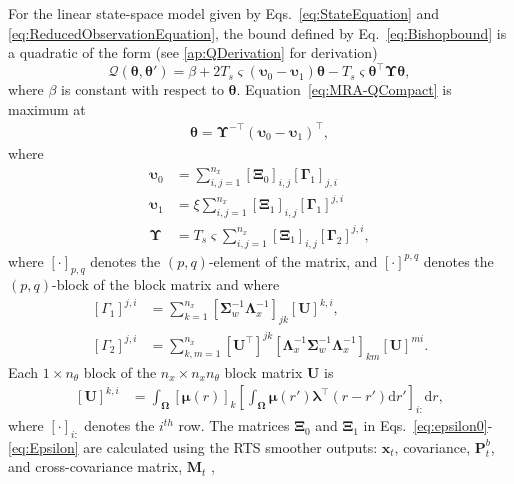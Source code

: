 \documentclass[review,authoryear,3p]{elsarticle}
\begin{document}
For the linear state-space model given by Eqs.~\eqref{eq:StateEquation} and \eqref{eq:ReducedObservationEquation}, the bound defined by Eq.~\eqref{eq:Bishopbound} is a quadratic of the form (see \ref{ap:QDerivation} for derivation) 
\begin{equation}\label{eq:MRA-QCompact}
\mathcal Q\left(\boldsymbol \theta,\boldsymbol\theta'\right)=\beta+2T_s\varsigma\left(\boldsymbol\upsilon_0-\boldsymbol\upsilon_1\right)\boldsymbol\theta-T_s\varsigma\boldsymbol\theta^\top\boldsymbol\Upsilon\boldsymbol\theta,
\end{equation}
where $\beta$ is constant with respect to $\boldsymbol\theta$. Equation~\eqref{eq:MRA-QCompact} is maximum at
\begin{align}\label{eq:MRA-thetahat}
\boldsymbol \theta= \boldsymbol\Upsilon^{-\top}(\boldsymbol\upsilon_0-\boldsymbol\upsilon_1)^\top,
\end{align}
where
\begin{align}
\boldsymbol\upsilon_0&=\sum_{i,j=1}^{n_x}[\boldsymbol\Xi_0]_{i,j}[\boldsymbol\Gamma_1]_{j,i}\label{eq:epsilon0} \\
\boldsymbol\upsilon_1&=\xi\sum_{i,j=1}^{n_x}[\boldsymbol\Xi_1]_{i,j}[\boldsymbol\Gamma_1]^{j,i} \label{eq:epsilon1}\\
\boldsymbol\Upsilon&=T_s\varsigma\sum_{i,j=1}^{n_x}[\boldsymbol\Xi_1]_{i,j}[\boldsymbol\Gamma_2]^{j,i},\label{eq:Epsilon}
\end{align} 
where $[\cdot]_{p,q}$ denotes the $\left(p,q\right)$-element of the matrix, and $ [\cdot]^{p,q}$ denotes the $\left(p,q\right)$-block of the block matrix and where 
\begin{align}
\left[ \Gamma_1\right]^{j,i} &=\sum_{k=1}^{n_x}\left[ \boldsymbol\Sigma_w^{-1}\boldsymbol\Lambda_x^{-1}\right]_{jk} \left[ \mathbf U\right]^{k,i},\\
\left[ \Gamma_2\right] ^{j,i}&=\sum_{k,m=1}^{n_x}[\mathbf U^{\top}]^{jk} \left[\boldsymbol\Lambda_x^{-1}\boldsymbol\Sigma_w^{-1}\boldsymbol\Lambda_x^{-1} \right]_{km}[\mathbf U]^{mi}.
\end{align}
Each $ 1 \times n_{\theta}$ block of the $n_x \times n_x n_{\theta}$ block matrix $\mathbf U$ is 
\begin{align}\label{eq:Uij}
\left[ \mathbf U\right] ^{k,i}&=\int_{\boldsymbol \Omega}\left[\boldsymbol\mu(r) \right]_k \left[\int_{\boldsymbol\Omega} \boldsymbol\mu\left(r'\right)\boldsymbol \lambda^\top \left(r-r'\right) \mathrm{d}r'\right]_{i:} \mathrm{d}r,
\end{align}
where $[\cdot]_{i:} $ denotes the $i^{th}$ row. The matrices $\boldsymbol\Xi_0$ and $\boldsymbol\Xi_1$ in Eqs.~\eqref{eq:epsilon0}-\eqref{eq:Epsilon} are calculated using the RTS smoother outputs: $\hat{\mathbf x}_t$, covariance, $\mathbf P_t^b$, and cross-covariance matrix, $\mathbf M_t$ \citep{Gibsona2005}, 
\end{document}
